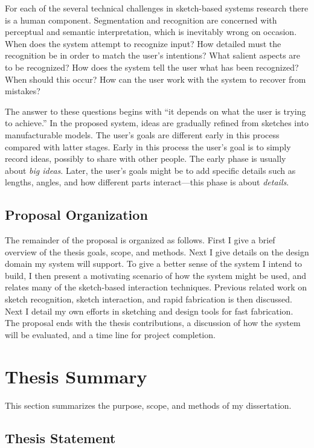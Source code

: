 \documentclass[11pt]{article}
\begin{document}
For each of the several technical challenges in sketch-based systems
research there is a human component. Segmentation and recognition are
concerned with perceptual and semantic interpretation, which is
inevitably wrong on occasion. When does the system attempt to
recognize input? How detailed must the recognition be in order to
match the user's intentions? What salient aspects are to be
recognized? How does the system tell the user what has been
recognized? When should this occur? How can the user work with the
system to recover from mistakes?

The answer to these questions begins with ``it depends on what the
user is trying to achieve.'' In the proposed system, ideas are
gradually refined from sketches into manufacturable models. The user's
goals are different early in this process compared with latter
stages. Early in this process the user's goal is to simply record
ideas, possibly to share with other people. The early phase is usually
about \textit{big ideas}. Later, the user's goals might be to add
specific details such as lengths, angles, and how different parts
interact---this phase is about \textit{details}.

\subsection{Proposal Organization}

The remainder of the proposal is organized as follows. First I give a
brief overview of the thesis goals, scope, and methods. Next I give
details on the design domain my system will support. To give a better
sense of the system I intend to build, I then present a motivating
scenario of how the system might be used, and relates many of the
sketch-based interaction techniques. Previous related work on sketch
recognition, sketch interaction, and rapid fabrication is then
discussed. Next I detail my own efforts in sketching and design tools
for fast fabrication. The proposal ends with the thesis contributions,
a discussion of how the system will be evaluated, and a time line for
project completion.

\section{Thesis Summary}

This section summarizes the purpose, scope, and methods of my
dissertation.

\subsection{Thesis Statement}
\end{document}
